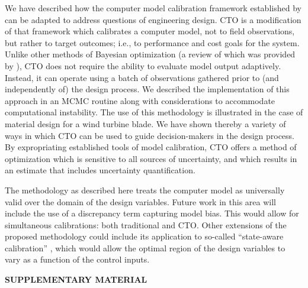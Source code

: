 \documentclass[12pt]{article}
\begin{document}
We have described how the 
computer model calibration framework established by \cite{Kennedy2001} can be adapted to address questions of engineering design. 
%
CTO is a modification of that framework which calibrates a computer model, not to field observations, but rather to target outcomes; i.e., to performance and cost goals for the system. 
%
Unlike other methods of Bayesian optimization (a review of which was provided by \citealt{Shahriari2016}), CTO does not require the ability to evaluate model output adaptively.
%
Instead, it can operate using a batch of observations gathered prior to (and independently of) the design process.
%
We described the implementation of this approach in an MCMC routine along with considerations to accommodate computational instability.
%
The use of this methodology is illustrated in the case of material design for a wind turbine blade. 
%
We have shown thereby a variety of ways in which CTO can be used to guide decision-makers in the design process. 
%
By expropriating established tools of model calibration, CTO offers a method of optimization which is sensitive to all sources of uncertainty, and which results in an estimate that includes uncertainty quantification.

The methodology as described here treats the computer model as universally valid over the domain of the design variables. 
%
Future work in this area will include the use of a discrepancy term capturing model bias.
%
This would allow for simultaneous calibrations: both traditional and CTO.
%
Other extensions of the proposed methodology could include its application to so-called ``state-aware calibration'' \citep{Atamturktur2015,Stevens2018,Brown2016}, which would allow the optimal region of the design variables to vary as a function of the control inputs.



\bigskip
\begin{center}
{\large\bf SUPPLEMENTARY MATERIAL}
\end{center}
\end{document}
